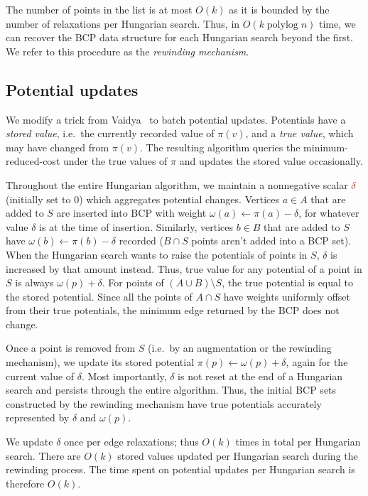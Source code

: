 \documentclass[a4paper,UKenglish]{socg-lipics-v2018}
\makeatletter
\def\polylog{\mathop{\mathrm{polylog}}}
\theoremstyle{plain}
\numberwithin{figure}{section}
\def\EMPH#1{\textcolor{BrickRed}{{\emph{#1}}}}
\def\n@te#1{\textsf{\boldmath \textbf{$\langle\!\langle$#1$\rangle\!\rangle$}}\leavevmode}
\def\note#1{\textcolor{red}{\n@te{#1}}}
\renewcommand{\note}[1]{} %
\makeatother
\begin{document}
The number of points in the list is at most $O(k)$ as it is bounded by the number of relaxations per
Hungarian search.
Thus, in $O(k\polylog n)$ time, we can recover the BCP data structure for each Hungarian search beyond the first.
%
We refer to this procedure as the \EMPH{rewinding mechanism}.


\begin{toappendix}
\subsection{Potential updates}
\label{SSA:potential-update}

We modify a trick from Vaidya~\cite{Vaidya89} to batch potential updates.
Potentials have a \EMPH{stored value}, i.e.\ the currently recorded value of
$\pi(v)$, and a \EMPH{true value}, which may have changed from $\pi(v)$.
The resulting algorithm queries the minimum-reduced-cost under the true values
of $\pi$ and updates the stored value occasionally.

Throughout the entire Hungarian algorithm, we maintain a nonnegative scalar
$\EMPH{$\delta$}$ (initially set to $0$) which aggregates potential changes.
Vertices $a \in A$ that are added to $S$ are inserted into BCP with weight
$\omega(a) \gets \pi(a) - \delta$, for whatever value $\delta$ is at the time
of insertion.
Similarly, vertices $b \in B$ that are added to $S$ have $\omega(b) \gets \pi(b) - \delta$
recorded ($B \cap S$ points aren't added into a BCP set).
When the Hungarian search wants to raise the potentials of points in $S$,
$\delta$ is increased by that amount instead.
Thus, true value for any potential of a point in $S$ is always $\omega(p) + \delta$.
For points of $(A \cup B) \setminus S$, the true potential is equal to the
stored potential.
Since all the points of $A \cap S$ have weights uniformly offset from their
true potentials, the minimum edge returned by the BCP does not change. \note{why?}

Once a point is removed from $S$ (i.e.\ by an augmentation or the rewinding
mechanism), we update its stored potential $\pi(p) \gets \omega(p) + \delta$,
again for the current value of $\delta$.
Most importantly, $\delta$ is not reset at the end of a Hungarian search and
persists through the entire algorithm.
Thus, the initial BCP sets constructed by the rewinding mechanism have true
potentials accurately represented by $\delta$ and $\omega(p)$.

We update $\delta$ once per edge relaxations; thus $O(k)$ times in total per Hungarian search.
There are $O(k)$ stored values updated per Hungarian search during the rewinding process.
The time spent on potential updates per Hungarian search is therefore $O(k)$.
\end{toappendix}
\end{document}
